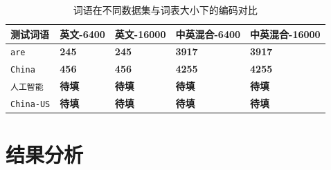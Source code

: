 \documentclass[a4paper,12pt]{ctexart} %
\begin{document}
\begin{table}[H]
    \centering
    \begin{tabular}{p{} p{} p{} p{} p{}}
        \toprule
        测试词语 & 英文-6400 & 英文-16000 & 中英混合-6400 & 中英混合-16000 \\
        \midrule
        \texttt{are} & \textbf{245} & \textbf{245} & \textbf{3917} & \textbf{3917} \\
        \texttt{China} & \textbf{456} & \textbf{456} & \textbf{4255} & \textbf{4255} \\
        \texttt{人工智能} & \textbf{待填} & \textbf{待填} & \textbf{待填} & \textbf{待填} \\
        \texttt{China-US} & \textbf{待填} & \textbf{待填} & \textbf{待填} & \textbf{待填} \\
        \bottomrule
    \end{tabular}
    \caption{词语在不同数据集与词表大小下的编码对比}
\end{table}


\section{结果分析}
\end{document}
